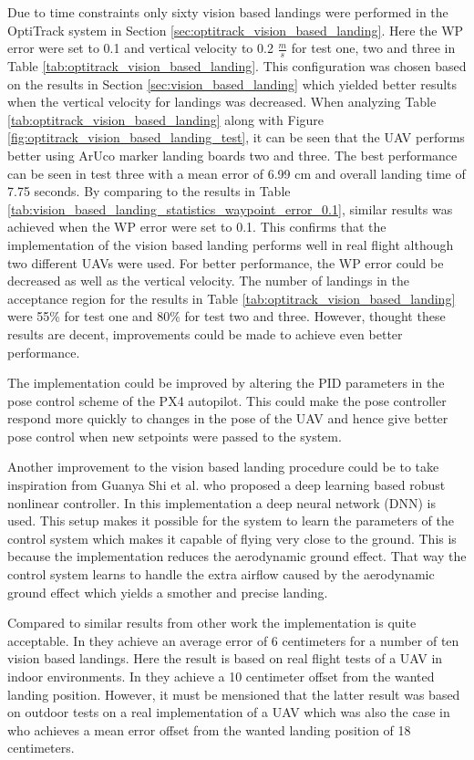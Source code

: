 \documentclass[../Head/report.tex]{subfiles}
\begin{document}
Due to time constraints only sixty vision based landings were performed in the OptiTrack system in Section \ref{sec:optitrack_vision_based_landing}. Here the WP error were set to 0.1 and vertical velocity to 0.2 $\frac{m}{s}$ for test one, two and three in Table \ref{tab:optitrack_vision_based_landing}. This configuration was chosen based on the results in Section \ref{sec:vision_based_landing} which yielded better results when the vertical velocity for landings was decreased. When analyzing Table \ref{tab:optitrack_vision_based_landing} along with Figure \ref{fig:optitrack_vision_based_landing_test}, it can be seen that the UAV performs better using ArUco marker landing boards two and three. The best performance can be seen in test three with a mean error of 6.99 cm and overall landing time of 7.75 seconds. By comparing to the results in Table \ref{tab:vision_based_landing_statistics_waypoint_error_0.1}, similar results was achieved when the WP error were set to 0.1. This confirms that the implementation of the vision based landing performs well in real flight although two different UAVs were used. For better performance, the WP error could be decreased as well as the vertical velocity. The number of landings in the acceptance region for the results in Table \ref{tab:optitrack_vision_based_landing} were 55\% for test one and 80\% for test two and three. However, thought these results are decent, improvements could be made to achieve even better performance.  

The implementation could be improved by altering the PID parameters in the pose control scheme of the PX4 autopilot. This could make the pose controller respond more quickly to changes in the pose of the UAV and hence give better pose control when new setpoints were passed to the system.    

Another improvement to the vision based landing procedure could be to take inspiration from Guanya Shi et al. \cite{NeuralLander} who proposed a deep
learning based robust nonlinear controller. In this implementation a deep neural network (DNN) is used. This setup makes it possible for the system to learn the parameters of the control system which makes it capable of flying very close to the ground. This is because the implementation reduces the aerodynamic ground effect. That way the control system learns to handle the extra airflow caused by the aerodynamic ground effect which yields a smother and precise landing.  

Compared to similar results from other work the implementation is quite acceptable. In \cite[p.~5]{AutomaticnavigationandlandingofanindoorAR} they achieve an average error of 6 centimeters for a number of ten vision based landings. Here the result is based on real flight tests of a UAV in indoor environments. In \cite[p.~56]{AutonomousRechargingSystemforDronesTwo} they achieve a 10 centimeter offset from the wanted landing position. However, it must be mensioned that the latter result was based on outdoor tests on a real implementation of a UAV which was also the case in \cite[p.~6]{AVisionBasedSystemForAutonomousVerticaLanding} who achieves a mean error offset from the wanted landing position of 18 centimeters.
\end{document}
